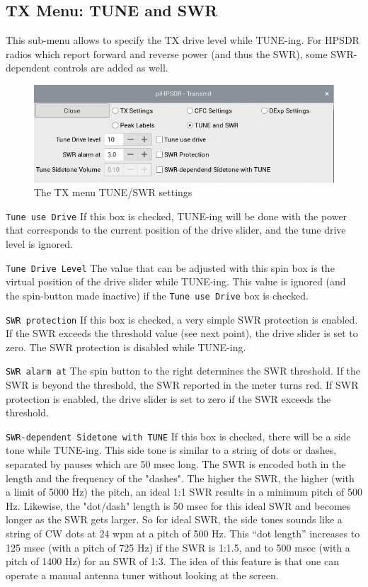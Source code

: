 \documentclass[12pt]{book}
\def\rett#1{\texttt{\color{red}#1}}
\begin{document}
\subsection{TX Menu: TUNE and SWR}
This sub-menu allows to specify the TX drive level while TUNE-ing. For HPSDR radios which report forward
and reverse power (and thus the SWR), some SWR-dependent controls are added as well.

\begin{figure}[ht]
\center
\includegraphics[scale=0.45]{TX_TUNE.png}
\caption{The TX menu TUNE/SWR settings}
\label{fig:TXTUNEMenu}
\end{figure}

\rett{Tune use Drive} If this box is checked, TUNE-ing will be done with the power that corresponds to the
current position of the drive slider, and the tune drive level is ignored.

\rett{Tune Drive Level} The value that can be adjusted with this spin box is the virtual position of the
drive slider while TUNE-ing. This value is ignored (and the spin-button made inactive)
if the \rett{Tune use Drive} box is checked.

\rett{SWR protection} If this box is checked, a very simple SWR protection is enabled. If the SWR exceeds
the threshold value (see next point), the drive slider is set to zero. The SWR protection is disabled
while TUNE-ing.

\rett{SWR alarm at} The spin button to the right determines the SWR threshold. If the SWR is beyond the
threshold, the SWR reported in the meter turns red. If SWR protection is enabled, the drive slider is set to
zero if the SWR exceeds the threshold.

\rett{SWR-dependent Sidetone with TUNE} If this box is checked, there will be a side tone while TUNE-ing.
This side tone is similar to a string of dots or dashes, separated by pauses which are 50 msec long.
The SWR is encoded both in the length and the frequency of the "dashes".  The higher
the SWR, the higher (with a limit of 5000 Hz) the pitch, an ideal 1:1 SWR results in a minimum pitch
of 500 Hz. Likewise, the "dot/dash" length is 50 msec for this ideal SWR and becomes longer as the SWR
gets larger. So for ideal SWR, the side tones sounds like a string of CW dots at 24 wpm at a pitch of
500 Hz. This ``dot length'' increases to 125 msec (with a pitch of 725 Hz) if the SWR is 1:1.5,
and to 500 msec (with a pitch of 1400 Hz) for an SWR of 1:3. The idea of
this feature is that one can operate a manual antenna tuner without looking at the screen.
\end{document}
